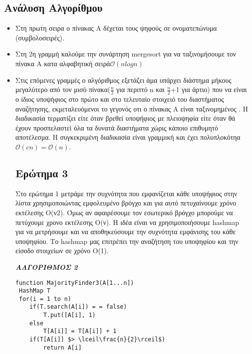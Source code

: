 \documentclass[a4paper]{article}
\begin{document}
\subsection*{Ανάλυση Αλγορίθμου}
\begin{itemize}
\item Στη πρωτη σειρα ο πίνακας Α δέχεται τους ψηφούς σε ονοματεπώνυμα (συμβολοσειρές).

    \item Στη 2η γραμμή καλούμε την συνάρτηση  mergesort για να ταξινομήσουμε τον πίνακα Α κατα αλφαβητική σειρά$\mathcal{O}(nlogn)$
    \item Στις επόμενες  γραμμές ο αλγόριθμος εξετάζει άμα υπάρχει  διάστημα μήκους μεγαλύτερο από τον μισό πίνακα($\frac{n}{2}$ για περιττό n  και  $\frac{n}{2}$+1 για άρτιο) που να είναι ο ίδιος υποψήφιος στο πρώτο και στο τελευταίο στοιχειό του διαστήματος αναζήτησης, εκμεταλευόμενοι  το γεγονός οτι ο πίνακας Α είναι ταξινομημένος . Η διαδικασία τερματίζει είτε όταν βρεθεί υποψήφιος με πλειοψηφία είτε όταν θά έχουν προσπελαστεί όλα τα δυνατά διαστήματα χώρις κάποιο επιθυμητό αποτέλεσμα. H συγκεκριμένη διαδικασία είναι γραμμική και  έχει πολυπλοκότηα $\mathcal{O}(cn)=\mathcal{O}(n)$.

\pagebreak
\subsection*{\color{red}Ερώτημα 3}
Στο ερώτημα 1 μετράμε την συχνότητα που εμφανίζεται κάθε υποψήφιος στην λίστα χρησιμοποιώντας εμφολευμένο βρόγχο και για αυτό πετυχαίνουμε χρόνο εκτέλεσης Ο(ν2).
Όμως αν αφαιρέσουμε τον εσωτερικό βρόγχο μπορούμε να πετύχουμε χρονο εκτέλεσης Ο(ν).
Η ιδέα είναι να χρησιμοποιήσουμε hashmap για να μετρήσουμε και να αποθηκεύσουμε την συχνότητα εμφάνισης του κάθε υποψηφίου. Το hashmap μας επιτρέπει την αναζήτηση του υποψηφίου και την είσοδο στοιχείων σε χρόνο Ο(1)\footnotemark[7].

\begin{center}
\textit{\textbf{ΑΛΓΟΡΙΘΜΟΣ 2}}
\end{center}

\begin{lstlisting}[mathescape]
function MajorityFinder3(A[1...n])
 HashMap T
 for(i = 1 to n)
 	if(T.search(A[i]) = = false)
 		T.put([A[i], 1)
 	else 
 		T[A[i]] = T[A[i]] + 1
 	if(T[A[i]] $> \lceil\frac{n}{2}\rceil$)
 		return A[i]
\end{lstlisting}


\end{itemize}
\end{document}
